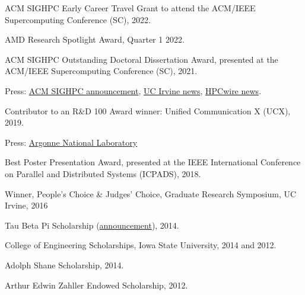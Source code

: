 \documentclass[11pt,article,oneside]{memoir}
\begin{document}
\def\labelprefix{}
\begin{etaremune}

\item ACM SIGHPC Early Career Travel Grant to attend the ACM/IEEE Supercomputing Conference (SC), 2022.

\item AMD Research Spotlight Award, Quarter 1 2022.

\item ACM SIGHPC Outstanding Doctoral Dissertation Award, presented at the ACM/IEEE Supercomputing Conference (SC), 2021.

\ind \hspace{0.35in} \footnotesize Press: \href{https://www.sighpc.org/for-your-career/dissertation-award/2021-award-winner-rohit-zambre}{ACM SIGHPC announcement},
	\href{https://engineering.uci.edu/news/2021/7/zambre-wins-outstanding-doctoral-dissertation-award-supercomputing-communication}{UC Irvine news},
	\href{https://www.hpcwire.com/off-the-wire/acm-sighpc-announces-doctoral-dissertation-award-winner-rohit-zambre/}{HPCwire news}.
\normalsize

\item Contributor to an R\&D 100 Award winner: Unified Communication X (UCX), 2019.

\ind \hspace{0.35in} \footnotesize Press: \href{https://www.anl.gov/article/argonne-and-partners-take-home-nine-rd-100-awards-in-2019}{Argonne National Laboratory}
\normalsize

\item Best Poster Presentation Award, presented at the IEEE International Conference on Parallel and Distributed Systems (ICPADS), 2018.

\item Winner, People's Choice \& Judges' Choice, Graduate Research Symposium, UC Irvine, 2016

\item Tau Beta Pi Scholarship (\href{https://www.tbp.org/memb/ScholarArchives/ScholarReleases/2014ScholarshipRelease.pdf}{announcement}), 2014.

\item College of Engineering Scholarships, Iowa State University, 2014 and 2012.

	\ind \hspace{0.35in} \footnotesize Adolph Shane Scholarship, 2014.

	\vspace{-0.5em}
	\ind \hspace{0.35in} Arthur Edwin Zahller Endowed Scholarship, 2012.


\end{etaremune}
\end{document}
